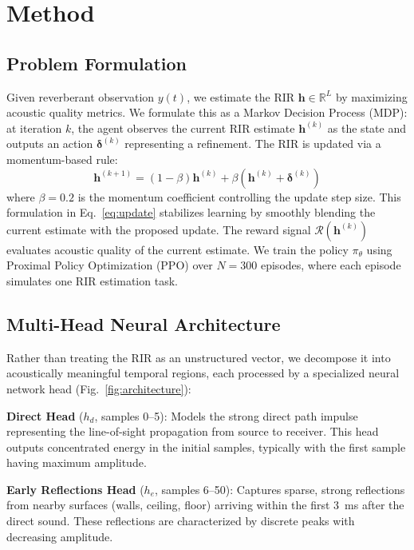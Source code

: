 \documentclass[10pt,conference]{IEEEtran}
\begin{document}
\section{Method}

\subsection{Problem Formulation}

Given reverberant observation $y(t)$, we estimate the RIR $\mathbf{h} \in \mathbb{R}^L$ by maximizing acoustic quality metrics. We formulate this as a Markov Decision Process (MDP): at iteration $k$, the agent observes the current RIR estimate $\mathbf{h}^{(k)}$ as the state and outputs an action $\boldsymbol{\delta}^{(k)}$ representing a refinement. The RIR is updated via a momentum-based rule:
\begin{equation}
\mathbf{h}^{(k+1)} = (1-\beta)\mathbf{h}^{(k)} + \beta(\mathbf{h}^{(k)} + \boldsymbol{\delta}^{(k)})
\label{eq:update}
\end{equation}
where $\beta=0.2$ is the momentum coefficient controlling the update step size. This formulation in Eq.~\ref{eq:update} stabilizes learning by smoothly blending the current estimate with the proposed update. The reward signal $\mathcal{R}(\mathbf{h}^{(k)})$ evaluates acoustic quality of the current estimate. We train the policy $\pi_\theta$ using Proximal Policy Optimization (PPO) \cite{schulman2017proximal} over $N=300$ episodes, where each episode simulates one RIR estimation task.

\subsection{Multi-Head Neural Architecture}

Rather than treating the RIR as an unstructured vector, we decompose it into acoustically meaningful temporal regions, each processed by a specialized neural network head (Fig.~\ref{fig:architecture}):

\textbf{Direct Head} ($h_d$, samples 0--5): Models the strong direct path impulse representing the line-of-sight propagation from source to receiver. This head outputs concentrated energy in the initial samples, typically with the first sample having maximum amplitude.

\textbf{Early Reflections Head} ($h_e$, samples 6--50): Captures sparse, strong reflections from nearby surfaces (walls, ceiling, floor) arriving within the first 3~ms after the direct sound. These reflections are characterized by discrete peaks with decreasing amplitude.
\end{document}
